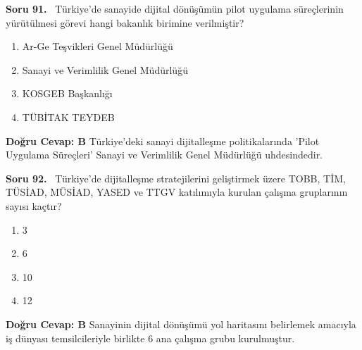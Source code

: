 \documentclass[11pt,a4paper,openany]{book}
\begin{document}
\needspace{5cm}
\vspace{8pt}
\noindent\textbf{\large\sffamily Soru 91.} \ Türkiye'de sanayide dijital dönüşümün pilot uygulama süreçlerinin yürütülmesi görevi hangi bakanlık birimine verilmiştir?
\begin{enumerate}[label=\Alph*), leftmargin=25pt, topsep=4pt, itemsep=2pt]
    \item Ar-Ge Teşvikleri Genel Müdürlüğü
    \item Sanayi ve Verimlilik Genel Müdürlüğü
    \item KOSGEB Başkanlığı
    \item TÜBİTAK TEYDEB
\end{enumerate}
\vspace{4pt}
\begin{tcolorbox}[title=Cevap ve Açıklama, colback=gray!3!white, colframe=primarycolor!90!black, arc=2mm, fonttitle=\bfseries\sffamily, top=6pt, bottom=6pt]
    \textbf{Doğru Cevap: B}
    \vspace{2pt}
    Türkiye'deki sanayi dijitalleşme politikalarında 'Pilot Uygulama Süreçleri' Sanayi ve Verimlilik Genel Müdürlüğü uhdesindedir.
\end{tcolorbox}
\vspace{10pt}

\needspace{5cm}
\vspace{8pt}
\noindent\textbf{\large\sffamily Soru 92.} \ Türkiye'de dijitalleşme stratejilerini geliştirmek üzere TOBB, TİM, TÜSİAD, MÜSİAD, YASED ve TTGV katılımıyla kurulan çalışma gruplarının sayısı kaçtır?
\begin{enumerate}[label=\Alph*), leftmargin=25pt, topsep=4pt, itemsep=2pt]
    \item 3
    \item 6
    \item 10
    \item 12
\end{enumerate}
\vspace{4pt}
\begin{tcolorbox}[title=Cevap ve Açıklama, colback=gray!3!white, colframe=primarycolor!90!black, arc=2mm, fonttitle=\bfseries\sffamily, top=6pt, bottom=6pt]
    \textbf{Doğru Cevap: B}
    \vspace{2pt}
    Sanayinin dijital dönüşümü yol haritasını belirlemek amacıyla iş dünyası temsilcileriyle birlikte 6 ana çalışma grubu kurulmuştur.
\end{tcolorbox}
\vspace{10pt}
\end{document}
